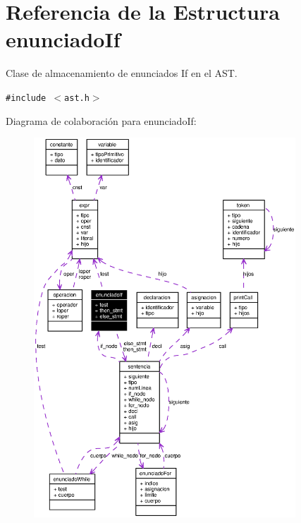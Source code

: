 \section{Referencia de la Estructura enunciado\-If}
\label{structenunciadoIf}
Clase de almacenamiento de enunciados If en el AST.  


{\tt \#include $<$ast.h$>$}

Diagrama de colaboraci\'{o}n para enunciado\-If:\begin{figure}[H]
\begin{center}
\leavevmode
\includegraphics[width=278pt]{structenunciadoIf__coll__graph}
\end{center}
\end{figure}
